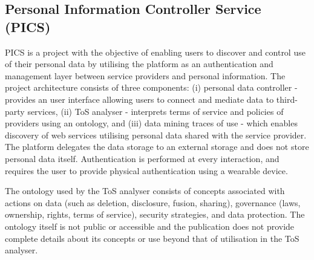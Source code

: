 \subsection{Personal Information Controller Service (PICS)}
PICS is a project with the objective of enabling users to discover and control use of their personal data by utilising the platform as an authentication and management layer between service providers and personal information. The project architecture \cite{winckler_personal_2019} consists of three components: (i) personal data controller - provides an user interface allowing users to connect and mediate data to third-party services, (ii) ToS analyser - interprets terms of service and policies of providers using an ontology, and (iii) data mining traces of use - which enables discovery of web services utilising personal data shared with the service provider. The platform delegates the data storage to an external storage and does not store personal data itself. Authentication is performed at every interaction, and requires the user to provide physical authentication using a wearable device.

The ontology used by the ToS analyser \cite{benfenatki_towards_2019} consists of concepts associated with actions on data (such as deletion, disclosure, fusion, sharing), governance (laws, ownership, rights, terms of service), security strategies, and data protection. The ontology itself is not public or accessible and the publication does not provide complete details about its concepts or use beyond that of utilisation in the ToS analyser.

